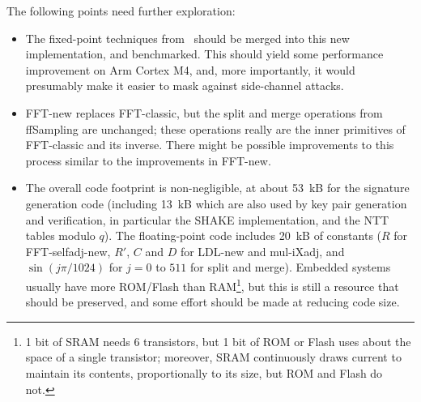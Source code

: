 \documentclass{llncs}
\begin{document}
The following points need further exploration:
\begin{itemize}

    \item The fixed-point techniques from~\cite{AlmFouLacPre2026}
    should be merged into this new implementation, and benchmarked.
    This should yield some performance improvement on Arm Cortex M4,
    and, more importantly, it would presumably make it easier to
    mask against side-channel attacks.

    \item \textsf{FFT-new} replaces \textsf{FFT-classic}, but the
    \textsf{split} and \textsf{merge} operations from
    \textsf{ffSampling} are unchanged; these operations really are the
    inner primitives of \textsf{FFT-classic} and its inverse. There
    might be possible improvements to this process similar to the
    improvements in \textsf{FFT-new}.

    \item The overall code footprint is non-negligible, at about 53~kB
    for the signature generation code (including 13~kB which are also
    used by key pair generation and verification, in particular the
    SHAKE implementation, and the NTT tables modulo $q$). The
    floating-point code includes 20~kB of constants ($R$ for
    \textsf{FFT-selfadj-new}, $R'$, $C$ and $D$ for \textsf{LDL-new} and
    \textsf{mul-iXadj}, and $\sin(j\pi/1024)$ for $j = 0$ to $511$ for
    \textsf{split} and \textsf{merge}). Embedded systems usually have
    more ROM/Flash than RAM\footnote{1 bit of SRAM needs 6 transistors,
    but 1 bit of ROM or Flash uses about the space of a single
    transistor; moreover, SRAM continuously draws current to maintain
    its contents, proportionally to its size, but ROM and Flash do
    not.}, but this is still a resource that should be preserved, and
    some effort should be made at reducing code size.

\end{itemize}

\end{document}
